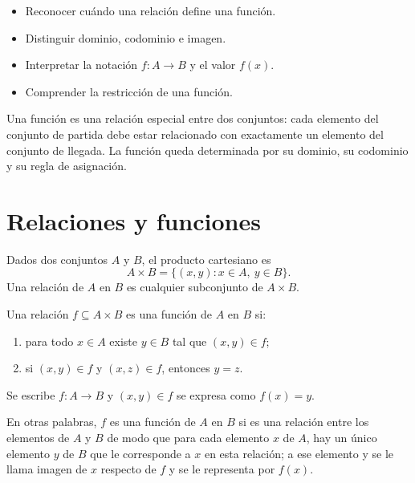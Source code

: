 \documentclass[10pt,a5paper]{article}
\begin{document}

\begin{objetivos}
\begin{itemize}
  \item Reconocer cuándo una relación define una función.
  \item Distinguir dominio, codominio e imagen.
  \item Interpretar la notación $f:A\to B$ y el valor $f(x)$.
  \item Comprender la restricción de una función.
\end{itemize}
\end{objetivos}      

\begin{resumen}
Una función es una relación especial entre dos conjuntos: cada elemento del conjunto de partida debe estar relacionado con exactamente un elemento del conjunto de llegada. La función queda determinada por su dominio, su codominio y su regla de asignación.
\end{resumen}

\section*{Relaciones y funciones}

Dados dos conjuntos $A$ y $B$, el producto cartesiano es
\[
A\times B=\{(x,y):x\in A,\ y\in B\}.
\]
Una relación de $A$ en $B$ es cualquier subconjunto de $A\times B$.

\begin{definicion}[función]
Una relación $f\subseteq A\times B$ es una función de $A$ en $B$ si:
\begin{enumerate}
  \item para todo $x\in A$ existe $y\in B$ tal que $(x,y)\in f$;
  \item si $(x,y)\in f$ y $(x,z)\in f$, entonces $y=z$.
\end{enumerate}
Se escribe $f:A\to B$ y $(x,y)\in f$ se expresa como $f(x)=y$.
\end{definicion}

\begin{nota}
En otras palabras, $f$ es una función de $A$ en $B$ si es una relación entre los
elementos de $A$ y $B$ de modo que para cada elemento $x$ de $A$, hay un único
elemento $y$ de $B$ que le corresponde a $x$ en esta relación; a ese elemento y
se le llama imagen de $x$ respecto de $f$ y se le representa por $f(x)$.
\end{nota}
\end{document}
